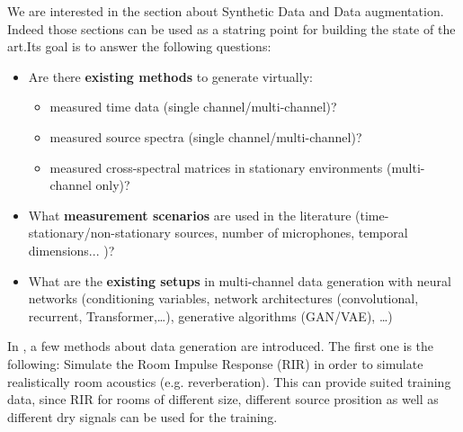 \documentclass{article}
\begin{document}
We are interested in the section about Synthetic Data and Data augmentation. Indeed those sections can be used as a statring point for building the state of the art.Its goal is to answer the following questions:


\begin{itemize}
    \item Are there \textbf{existing methods} to generate virtually:
    \begin{itemize}
        \item measured time data (single channel/multi-channel)?
        \item measured source spectra (single channel/multi-channel)?
        \item measured cross-spectral matrices in stationary environments (multi-channel only)?
        
    \end{itemize}
    \item What \textbf{measurement scenarios} are used in the literature (time-stationary/non-stationary sources, number of microphones, temporal dimensions... )?
    \item What are the \textbf{existing setups} in multi-channel data generation with neural networks (conditioning variables, network architectures (convolutional, recurrent, Transformer,\dots), generative algorithms (GAN/VAE), \dots)
\end{itemize}

In \cite{grumiaux2022survey}, a few methods about data generation are introduced. The first one is the following: Simulate the Room Impulse Response (RIR) in order to simulate realistically room acoustics (e.g. reverberation). This can provide suited training data, since RIR for rooms of different size, different source prosition as well as different dry signals can be used for the training.

















 
\end{document}
